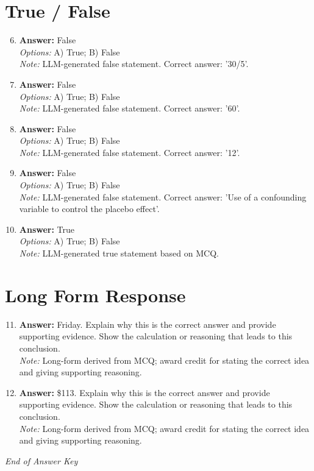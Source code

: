 \documentclass[12pt]{article}
\begin{document}
\section*{True / False}
\begin{enumerate}[label=\arabic*.]
\setcounter{enumi}{5}
\item \textbf{Answer:} False
\\ \textit{Options:} A) True; B) False
\\ \textit{Note:} LLM-generated false statement. Correct answer: '30/5'.
\item \textbf{Answer:} False
\\ \textit{Options:} A) True; B) False
\\ \textit{Note:} LLM-generated false statement. Correct answer: '60'.
\item \textbf{Answer:} False
\\ \textit{Options:} A) True; B) False
\\ \textit{Note:} LLM-generated false statement. Correct answer: '12'.
\item \textbf{Answer:} False
\\ \textit{Options:} A) True; B) False
\\ \textit{Note:} LLM-generated false statement. Correct answer: 'Use of a confounding variable to control the placebo effect'.
\item \textbf{Answer:} True
\\ \textit{Options:} A) True; B) False
\\ \textit{Note:} LLM-generated true statement based on MCQ.
\end{enumerate}

\section*{Long Form Response}
\begin{enumerate}[label=\arabic*.]
\setcounter{enumi}{10}
\item \textbf{Answer:} Friday. Explain why this is the correct answer and provide supporting evidence. Show the calculation or reasoning that leads to this conclusion.
\\ \textit{Note:} Long-form derived from MCQ; award credit for stating the correct idea and giving supporting reasoning.
\item \textbf{Answer:} \$113. Explain why this is the correct answer and provide supporting evidence. Show the calculation or reasoning that leads to this conclusion.
\\ \textit{Note:} Long-form derived from MCQ; award credit for stating the correct idea and giving supporting reasoning.
\end{enumerate}

\vfill
\noindent\textit{End of Answer Key}
\end{document}
